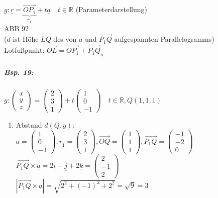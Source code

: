 \begin{enumerate}
$g: \underline{r}=\underbrace{\overrightarrow{OP_1}}_{\underline{r}_1}+t\underline{a} \quad t \in \mathbb{R}$ (Parameterdarstellung)\\
ABB 92\\
($d$ ist Höhe $\overline{LQ}$ des von $\underline{a}$ und $\overrightarrow{P_1Q}$ aufgespannten Parallelogramms)\\
Lotfußpunkt: $\boxed{\overrightarrow{OL}=\overrightarrow{OP_1}+\overrightarrow{P_1Q}_{\underline{a}}}$
\subparagraph{Bsp. 19:} \parskp
$g: \begin{pmatrix}
x\\
y\\
z
\end{pmatrix}=\begin{pmatrix}
2\\
3\\
1
\end{pmatrix}+t \begin{pmatrix}
1\\
0\\
-1
\end{pmatrix} \quad t \in \mathbb{R}, Q(1,1,1)$
\begin{enumerate}
\item Abstand $d(Q,g)$:\\
$\underline{a}=\begin{pmatrix}
1\\
0\\
-1
\end{pmatrix} , \underline{r}_1=\begin{pmatrix}
2\\
3\\
1
\end{pmatrix}, \overrightarrow{OQ}=\begin{pmatrix}
1\\
1\\
1
\end{pmatrix}, \overrightarrow{P_1Q}=\begin{pmatrix}
-1\\
-2\\
0
\end{pmatrix}$\\
$\overrightarrow{P_1Q} \times \underline{a} = 2 \underline{i} - \underline{j} + 2 \underline{k}= \begin{pmatrix}
2\\
-1\\
2
\end{pmatrix}$\\
$\left| \overrightarrow{P_1Q} \times \underline{a}\right| = \sqrt{2^2+(-1)^2+2^2}= \sqrt{9} = 3$\\

\end{enumerate}
\end{enumerate}

